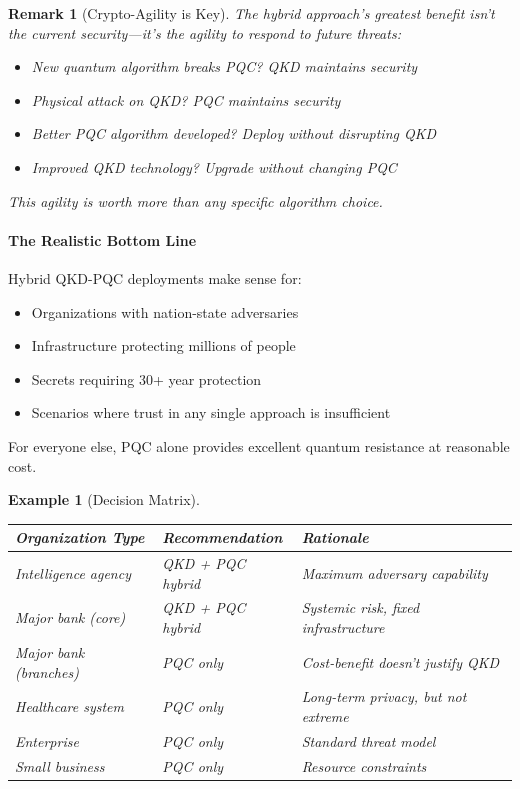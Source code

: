 \documentclass[11pt,a4paper]{article}
\newtheorem{example}{Example}
\newtheorem{remark}{Remark}
\begin{document}
\begin{remark}[Crypto-Agility is Key]
The hybrid approach's greatest benefit isn't the current security—it's the \emph{agility} to respond to future threats:
\begin{itemize}
    \item New quantum algorithm breaks PQC? QKD maintains security
    \item Physical attack on QKD? PQC maintains security  
    \item Better PQC algorithm developed? Deploy without disrupting QKD
    \item Improved QKD technology? Upgrade without changing PQC
\end{itemize}
This agility is worth more than any specific algorithm choice.
\end{remark}

\paragraph{The Realistic Bottom Line}

Hybrid QKD-PQC deployments make sense for:
\begin{itemize}
    \item Organizations with nation-state adversaries
    \item Infrastructure protecting millions of people
    \item Secrets requiring 30+ year protection
    \item Scenarios where trust in any single approach is insufficient
\end{itemize}

For everyone else, PQC alone provides excellent quantum resistance at reasonable cost.

\begin{example}[Decision Matrix]
\begin{center}
\begin{tabular}{|l|l|l|}
\hline
\textbf{Organization Type} & \textbf{Recommendation} & \textbf{Rationale} \\
\hline
Intelligence agency & QKD + PQC hybrid & Maximum adversary capability \\
Major bank (core) & QKD + PQC hybrid & Systemic risk, fixed infrastructure \\
Major bank (branches) & PQC only & Cost-benefit doesn't justify QKD \\
Healthcare system & PQC only & Long-term privacy, but not extreme \\
Enterprise & PQC only & Standard threat model \\
Small business & PQC only & Resource constraints \\
\hline
\end{tabular}
\end{center}
\end{example}
\end{document}
